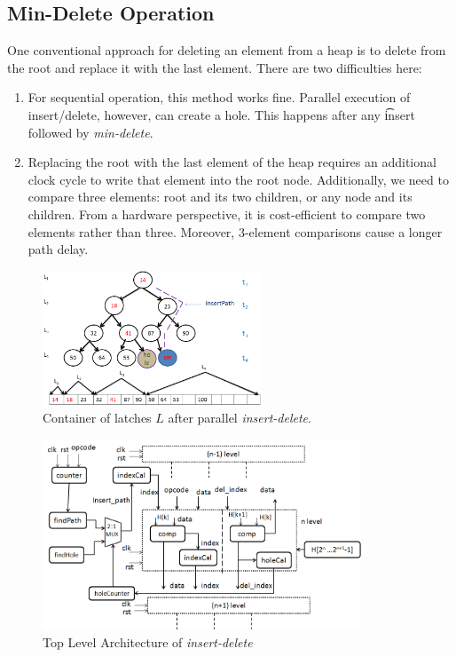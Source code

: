 \subsection{Min-Delete Operation}

One conventional approach for deleting an element from a heap is to delete from the root and replace it with the last element.
There are two difficulties here:

\begin{enumerate}
\item For sequential operation, this method works fine. Parallel execution of insert/delete, however, can create a hole. This happens after any {\t insert} followed by {\it min-delete}.
\item Replacing the root with the last element of the heap requires an additional clock cycle to write that element into the root node. Additionally, we need to compare three elements: root and its two children, or any node and its children. From a hardware perspective, it is cost-efficient to compare two elements rather than three. Moreover, 3-element comparisons cause a longer path delay.
\end{enumerate}

\begin{figure}[!ht]
  \centering
  \includegraphics[width=6.5cm]{fig/normal-insert-delete-latches.png}
      \caption{Container of latches $L$ after parallel {\it insert-delete}.}
    \label{hole-latches}
\end{figure}

\begin{figure}[!ht]
  \centering
  \includegraphics[width=9.5cm]{fig/2.png}
      \caption{Top Level Architecture of {\it insert-delete}}
    \label{fig10}
\end{figure}


